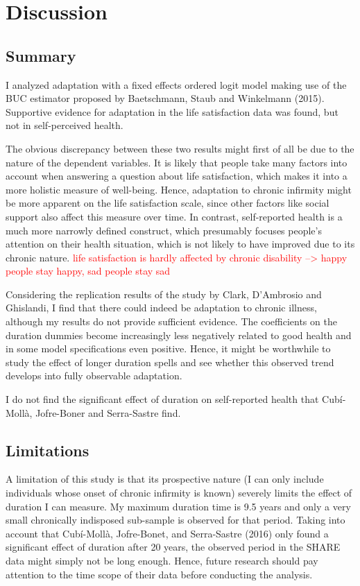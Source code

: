 \documentclass[12pt]{article}
\begin{document}
\FloatBarrier

\section{Discussion}

\subsection{Summary}
I analyzed adaptation with a fixed effects ordered logit model making use of the BUC estimator proposed by Baetschmann, Staub and Winkelmann (2015). Supportive evidence for adaptation in the life satisfaction data was found, but not in self-perceived health. 

The obvious discrepancy between these two results might first of all be due to the nature of the dependent variables. It is likely that people take many factors into account when answering a question about life satisfaction, which makes it into a more holistic measure of well-being. Hence, adaptation to chronic infirmity might be more apparent on the life satisfaction scale, since other factors like social support also affect this measure over time. In contrast, self-reported health is a much more narrowly defined construct, which presumably focuses people's attention on their health situation, which is not likely to have improved due to its chronic nature. \textcolor{red}{life satisfaction is hardly affected by chronic disability --> happy people stay happy, sad people stay sad}

Considering the replication results of the study by Clark, D'Ambrosio and Ghislandi, I find that there could indeed be adaptation to chronic illness, although my results do not provide sufficient evidence. The coefficients on the duration dummies become increasingly less negatively related to good health and in some model specifications even positive. Hence, it might be worthwhile to study the effect of longer duration spells and see whether this observed trend develops into fully observable adaptation.

I do not find the significant effect of duration on self-reported health that Cub\'i-Moll\`a, Jofre-Boner and Serra-Sastre find.  

\subsection{Limitations}
A limitation of this study is that its prospective nature (I can only include individuals whose onset of chronic infirmity is known) severely limits the effect of duration I can measure. My maximum duration time is 9.5 years and only a very small chronically indisposed sub-sample is observed for that period. Taking into account that  Cub\'i-Moll\`a, Jofre-Bonet, and Serra-Sastre (2016) only found a significant effect of duration after 20 years, the observed period in the SHARE data might simply not be long enough. Hence, future research should pay attention to the time scope of their data before conducting the analysis.
\end{document}
